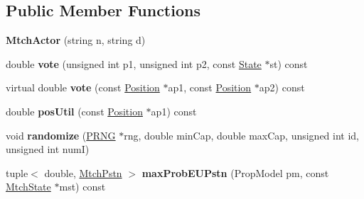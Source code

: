 \subsection*{Public Member Functions}
\begin{DoxyCompactItemize}
\item 
\hypertarget{class_demo_mtch_1_1_mtch_actor_ab88051b8646350e53e422cc6803db997}{{\bfseries Mtch\-Actor} (string n, string d)}\label{class_demo_mtch_1_1_mtch_actor_ab88051b8646350e53e422cc6803db997}

\item 
\hypertarget{class_demo_mtch_1_1_mtch_actor_a14bfaf0d6e9a5d767f46855ef206738a}{double {\bfseries vote} (unsigned int p1, unsigned int p2, const \hyperlink{class_k_base_1_1_state}{State} $\ast$st) const }\label{class_demo_mtch_1_1_mtch_actor_a14bfaf0d6e9a5d767f46855ef206738a}

\item 
\hypertarget{class_demo_mtch_1_1_mtch_actor_aa1414cdffb187a2d14ae3b30ce5686d8}{virtual double {\bfseries vote} (const \hyperlink{class_k_base_1_1_position}{Position} $\ast$ap1, const \hyperlink{class_k_base_1_1_position}{Position} $\ast$ap2) const }\label{class_demo_mtch_1_1_mtch_actor_aa1414cdffb187a2d14ae3b30ce5686d8}

\item 
\hypertarget{class_demo_mtch_1_1_mtch_actor_a124d78dfcb5499dc900206db5dd80753}{double {\bfseries pos\-Util} (const \hyperlink{class_k_base_1_1_position}{Position} $\ast$ap1) const }\label{class_demo_mtch_1_1_mtch_actor_a124d78dfcb5499dc900206db5dd80753}

\item 
\hypertarget{class_demo_mtch_1_1_mtch_actor_adfa057a20bf1245dadc78ba2b1c034c5}{void {\bfseries randomize} (\hyperlink{class_k_base_1_1_p_r_n_g}{P\-R\-N\-G} $\ast$rng, double min\-Cap, double max\-Cap, unsigned int id, unsigned int num\-I)}\label{class_demo_mtch_1_1_mtch_actor_adfa057a20bf1245dadc78ba2b1c034c5}

\item 
\hypertarget{class_demo_mtch_1_1_mtch_actor_a2a6a0273d00b2ccc996ccf0c959d4742}{tuple$<$ double, \hyperlink{class_k_base_1_1_mtch_pstn}{Mtch\-Pstn} $>$ {\bfseries max\-Prob\-E\-U\-Pstn} (Prop\-Model pm, const \hyperlink{class_demo_mtch_1_1_mtch_state}{Mtch\-State} $\ast$mst) const }\label{class_demo_mtch_1_1_mtch_actor_a2a6a0273d00b2ccc996ccf0c959d4742}

\end{DoxyCompactItemize}

